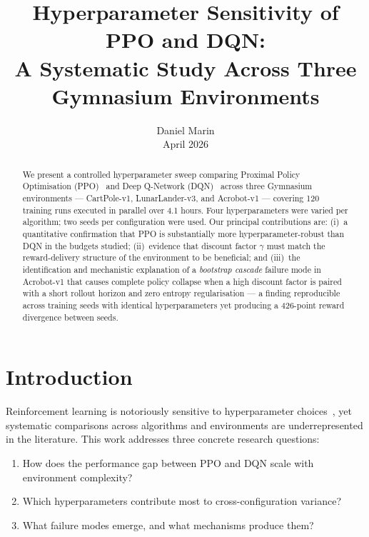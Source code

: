\documentclass[10pt, a4paper, twocolumn]{article}
\title{%
  \textbf{Hyperparameter Sensitivity of PPO and DQN:\\
  A Systematic Study Across Three Gymnasium Environments}
}
\author{Daniel Marin\\[0.3em]
  \small April 2026}
\date{}
\begin{document}
\maketitle

\begin{abstract}
\noindent
We present a controlled hyperparameter sweep comparing Proximal Policy
Optimisation (PPO)~\cite{schulman2017proximal} and Deep Q-Network
(DQN)~\cite{mnih2015human} across three Gymnasium environments — CartPole-v1,
LunarLander-v3, and Acrobot-v1 — covering 120 training runs executed in
parallel over 4.1 hours.
Four hyperparameters were varied per algorithm; two seeds per configuration
were used.
Our principal contributions are: (i)~a quantitative confirmation that PPO
is substantially more hyperparameter-robust than DQN in the budgets studied;
(ii)~evidence that discount factor $\gamma$ must match the reward-delivery
structure of the environment to be beneficial; and (iii)~the identification
and mechanistic explanation of a \emph{bootstrap cascade} failure mode in
Acrobot-v1 that causes complete policy collapse when a high discount factor
is paired with a short rollout horizon and zero entropy regularisation —
a finding reproducible across training seeds with identical hyperparameters
yet producing a 426-point reward divergence between seeds.
\end{abstract}

\section{Introduction}

Reinforcement learning is notoriously sensitive to hyperparameter
choices~\cite{henderson2018deep}, yet systematic comparisons across algorithms
and environments are underrepresented in the literature.
This work addresses three concrete research questions:
\begin{enumerate}
  \item How does the performance gap between PPO and DQN scale with
        environment complexity?
  \item Which hyperparameters contribute most to cross-configuration variance?
  \item What failure modes emerge, and what mechanisms produce them?
\end{enumerate}
\end{document}
